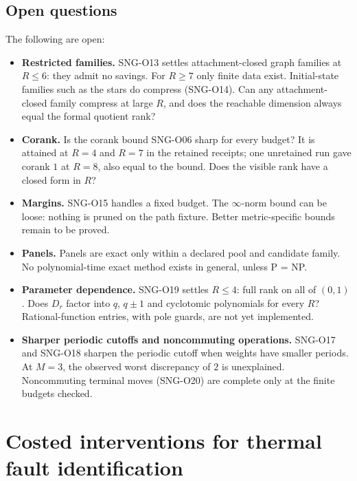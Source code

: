 \documentclass[
  11pt,
  a4paper,
]{report}
\providecommand{\tightlist}{%
  \setlength{\itemsep}{0pt}\setlength{\parskip}{0pt}}
\begin{document}
\hypertarget{open-questions}{%
\section{Open questions}\label{open-questions}}

The following are open:

\begin{itemize}
\tightlist
\item
  \textbf{Restricted families.} SNG-O13 settles attachment-closed graph
  families at \(R\le6\): they admit no savings. For \(R\ge7\) only
  finite data exist. Initial-state families such as the stars do
  compress (SNG-O14). Can any attachment-closed family compress at large
  \(R\), and does the reachable dimension always equal the formal
  quotient rank?
\item
  \textbf{Corank.} Is the corank bound SNG-O06 sharp for every budget?
  It is attained at \(R=4\) and \(R=7\) in the retained receipts; one
  unretained run gave corank \(1\) at \(R=8\), also equal to the bound.
  Does the visible rank have a closed form in \(R\)?
\item
  \textbf{Margins.} SNG-O15 handles a fixed budget. The \(\infty\)-norm
  bound can be loose: nothing is pruned on the path fixture. Better
  metric-specific bounds remain to be proved.
\item
  \textbf{Panels.} Panels are exact only within a declared pool and
  candidate family. No polynomial-time exact method exists in general,
  unless P = NP.
\item
  \textbf{Parameter dependence.} SNG-O19 settles \(R\le4\): full rank on
  all of \((0,1)\). Does \(D_r\) factor into \(q\), \(q\pm1\) and
  cyclotomic polynomials for every \(R\)? Rational-function entries,
  with pole guards, are not yet implemented.
\item
  \textbf{Sharper periodic cutoffs and noncommuting operations.} SNG-O17
  and SNG-O18 sharpen the periodic cutoff when weights have smaller
  periods. At \(M=3\), the observed worst discrepancy of \(2\) is
  unexplained. Noncommuting terminal moves (SNG-O20) are complete only
  at the finite budgets checked.
\end{itemize}

\hypertarget{costed-interventions-for-thermal-fault-identification}{%
\chapter{Costed interventions for thermal fault
identification}\label{costed-interventions-for-thermal-fault-identification}}
\end{document}
